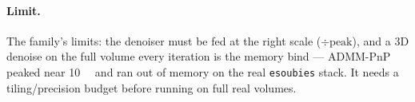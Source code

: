 \paragraph{Limit.}
The family's limits: the denoiser must be fed at the right scale ($\div\text{peak}$), and a 3D
denoise on the full volume every iteration is the memory bind --- ADMM-PnP peaked near
\SI{10}{\giga\byte} and ran out of memory on the real \texttt{esoubies} stack. It needs a
tiling/precision budget before running on full real volumes.
